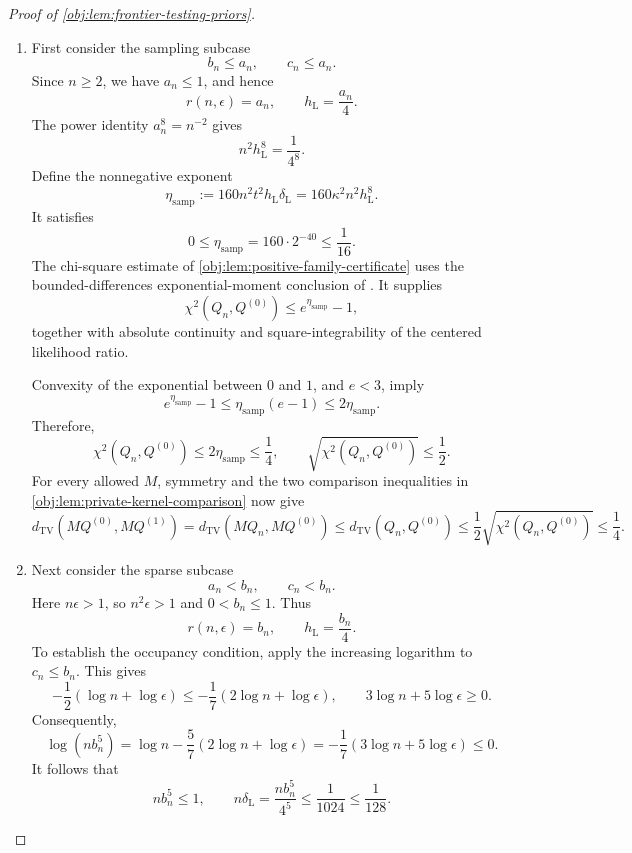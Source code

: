 \begin{proof}[Proof of \cref{obj:lem:frontier-testing-priors}]
\begin{enumerate}
\item First consider the sampling subcase
\[
b_n\le a_n,\qquad c_n\le a_n.
\]
Since \(n\ge2\), we have \(a_n\le1\), and hence
\[
r(n,\epsilon)=a_n,\qquad
h_{\mathrm L}=\frac{a_n}{4}.
\]
The power identity \(a_n^8=n^{-2}\) gives
\[
n^2h_{\mathrm L}^{8}=\frac1{4^8}.
\]
Define the nonnegative exponent
\[
\eta_{\mathrm{samp}}
:=160n^2t^2h_{\mathrm L}\delta_{\mathrm L}
 =160\kappa^2n^2h_{\mathrm L}^{8}.
\]
It satisfies
\[
0\le\eta_{\mathrm{samp}}
 =160\cdot2^{-40}\le\frac1{16}.
\]
The chi-square estimate of
\cref{obj:lem:positive-family-certificate} uses the bounded-differences
exponential-moment conclusion of
\citep[Theorem~6.2, displayed log-mgf conclusion in its proof, p.~167]{BoucheronLugosiMassart2013}.
It supplies
\[
\chi^2(Q_n,Q^{(0)})\le e^{\eta_{\mathrm{samp}}}-1,
\]
together with absolute continuity and square-integrability of the centered
likelihood ratio.

Convexity of the exponential between \(0\) and \(1\), and \(e<3\), imply
\[
e^{\eta_{\mathrm{samp}}}-1
\le\eta_{\mathrm{samp}}(e-1)
\le2\eta_{\mathrm{samp}}.
\]
Therefore,
\[
\chi^2(Q_n,Q^{(0)})\le2\eta_{\mathrm{samp}}\le\frac14,
\qquad
\sqrt{\chi^2(Q_n,Q^{(0)})}\le\frac12.
\]
For every allowed \(M\), symmetry and the two comparison inequalities in
\cref{obj:lem:private-kernel-comparison} now give
\[
d_{\mathrm{TV}}(MQ^{(0)},MQ^{(1)})
=d_{\mathrm{TV}}(MQ_n,MQ^{(0)})
\le d_{\mathrm{TV}}(Q_n,Q^{(0)})
\le\frac12\sqrt{\chi^2(Q_n,Q^{(0)})}
\le\frac14.
\]

\item Next consider the sparse subcase
\[
a_n<b_n,\qquad c_n<b_n.
\]
Here \(n\epsilon>1\), so \(n^2\epsilon>1\) and \(0<b_n\le1\). Thus
\[
r(n,\epsilon)=b_n,\qquad h_{\mathrm L}=\frac{b_n}{4}.
\]
To establish the occupancy condition, apply the increasing logarithm to
\(c_n\le b_n\). This gives
\[
-\frac12(\log n+\log\epsilon)
\le-\frac17(2\log n+\log\epsilon),
\qquad
3\log n+5\log\epsilon\ge0.
\]
Consequently,
\[
\log(nb_n^5)
=\log n-\frac57(2\log n+\log\epsilon)
=-\frac17(3\log n+5\log\epsilon)
\le0.
\]
It follows that
\[
nb_n^5\le1,\qquad
n\delta_{\mathrm L}
=\frac{nb_n^5}{4^5}
\le\frac1{1024}\le\frac1{128}.
\]


\end{enumerate}
\end{proof}
